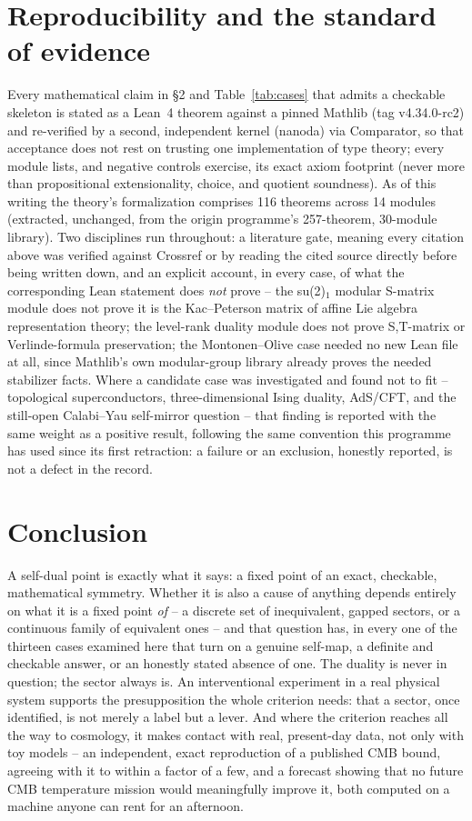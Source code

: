 \documentclass[11pt,a4paper]{article}
\begin{document}
\section{Reproducibility and the standard of evidence}

Every mathematical claim in \S2 and Table~\ref{tab:cases} that admits a checkable skeleton is stated as
a Lean~4 theorem against a pinned Mathlib (tag v4.34.0-rc2) and re-verified by a second, independent
kernel (nanoda) via Comparator, so that acceptance does not rest on trusting one implementation of
type theory; every module lists, and negative controls exercise, its exact axiom footprint (never more
than propositional extensionality, choice, and quotient soundness). As of this writing the theory's formalization comprises 116 theorems across 14 modules (extracted, unchanged, from the
origin programme's 257-theorem, 30-module library). Two disciplines run throughout: a literature gate, meaning
every citation above was verified against Crossref or by reading the cited source directly before being
written down, and an explicit account, in every case, of what the corresponding Lean statement does
\emph{not} prove -- the su(2)$_1$ modular S-matrix module does not prove it is the Kac--Peterson matrix
of affine Lie algebra representation theory; the level-rank duality module does not prove S,T-matrix or
Verlinde-formula preservation; the Montonen--Olive case needed no new Lean file at all, since
Mathlib's own modular-group library already proves the needed stabilizer facts. Where a candidate case
was investigated and found not to fit -- topological superconductors, three-dimensional Ising duality,
AdS/CFT, and the still-open Calabi--Yau self-mirror question -- that finding is reported with the same
weight as a positive result, following the same convention this programme has used since its first
retraction: a failure or an exclusion, honestly reported, is not a defect in the record.

\section{Conclusion}

A self-dual point is exactly what it says: a fixed point of an exact, checkable, mathematical
symmetry. Whether it is also a cause of anything depends entirely on what it is a fixed point
\emph{of} -- a discrete set of inequivalent, gapped sectors, or a continuous family of equivalent
ones -- and that question has, in every one of the thirteen cases examined here that turn on a genuine
self-map, a definite and checkable answer, or an honestly stated absence of one. The duality is never in question; the sector
always is. An interventional experiment in a real physical system supports the presupposition the
whole criterion needs: that a sector, once identified, is not merely a label but a lever. And where the
criterion reaches all the way to cosmology, it makes contact with real, present-day data, not only with
toy models -- an independent, exact reproduction of a published CMB bound, agreeing with it to within a
factor of a few, and a forecast showing that no future CMB temperature mission would meaningfully
improve it, both computed on a machine anyone can rent for an afternoon.
\end{document}
